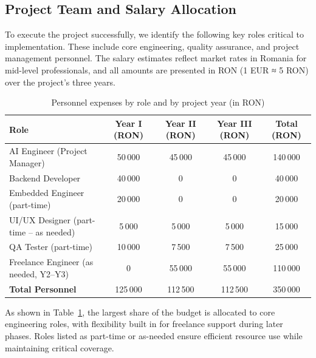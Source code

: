 \subsection{Project Team and Salary Allocation}

To execute the project successfully, we identify the following key roles critical to implementation. These include core engineering, quality assurance, and project management personnel. The salary estimates reflect market rates in Romania for mid-level professionals, and all amounts are presented in RON (1 EUR ≈ 5 RON) over the project's three years.

\vspace{0.5\baselineskip}

\begin{table}[htbp]
  \centering
  \begin{tabular}{p{3.5cm} c c c c}
    \hline
    \textbf{Role} & \textbf{Year I (RON)} & \textbf{Year II (RON)} & \textbf{Year III (RON)} & \textbf{Total (RON)} \\
    \hline
    AI Engineer (Project Manager)            &  50\,000 &  45\,000 &  45\,000 & 140\,000 \\
    Backend Developer                        &  40\,000 &       0  &       0  &  40\,000 \\
    Embedded Engineer (part-time)            &  20\,000 &       0  &       0  &  20\,000 \\
    UI/UX Designer (part-time – as needed)   &   5\,000 &   5\,000 &   5\,000 &  15\,000 \\
    QA Tester (part-time)                    &  10\,000 &   7\,500 &   7\,500 &  25\,000 \\
    Freelance Engineer (as needed, Y2–Y3)    &       0  &  55\,000 &  55\,000 & 110\,000 \\
    \hline
    \textbf{Total Personnel}                 & 125\,000 & 112\,500 & 112\,500 & 350\,000 \\
    \hline
  \end{tabular}
  \caption{Personnel expenses by role and by project year (in RON)}
  \label{tab:personnel-by-role}
\end{table}


As shown in Table~\ref{tab:personnel-by-role}, the largest share of the budget is allocated to core engineering roles, with flexibility built in for freelance support during later phases. Roles listed as part-time or as-needed ensure efficient resource use while maintaining critical coverage.

